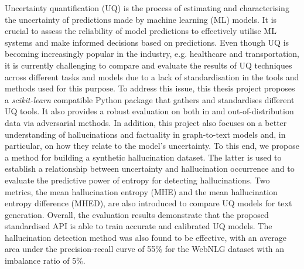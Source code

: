 Uncertainty quantification (UQ) is the process of estimating and characterising the uncertainty of predictions made by machine learning (ML) models. It is crucial to assess the reliability of model predictions to effectively utilise ML systems and make informed decisions based on predictions.
Even though UQ is becoming increasingly popular in the industry, e.g. healthcare and transportation, it is currently challenging to compare and evaluate the results of UQ techniques across different tasks and models due to a lack of standardisation in the tools and methods used for this purpose.
To address this issue, this thesis project proposes a \textit{scikit-learn} compatible Python package that gathers and standardises different UQ tools. 
It also provides a robust evaluation on both in and out-of-distribution data via adversarial methods.
In addition, this project also focuses on a better understanding of hallucinations and factuality in graph-to-text models and, in particular, on how they relate to the model's uncertainty. To this end, we propose a method for building a synthetic hallucination dataset. The latter is used to establish a relationship between uncertainty and hallucination occurrence and to evaluate the predictive power of entropy for detecting hallucinations. Two metrics, the mean hallucination entropy (MHE) and the mean hallucination entropy difference (MHED), are also introduced to compare UQ models for text generation.  
Overall, the evaluation results demonstrate that the proposed standardised API is able to train accurate and calibrated UQ models. The hallucination detection method was also found to be effective, with an average area under the precision-recall curve of 55\% for the WebNLG dataset with an imbalance ratio of 5\%.


